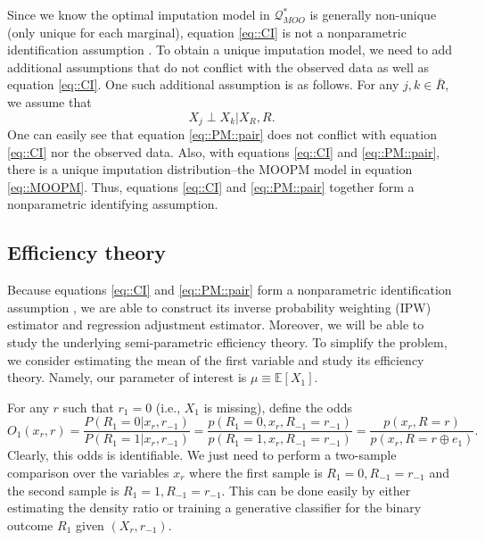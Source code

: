\documentclass[aos, preprint]{imsart}
\theoremstyle{plain}
\theoremstyle{definition}
\newcommand{\E}{\mbox{$\mathbb{E}$}}
\begin{document}


Since we know the optimal imputation model in $\mathcal{Q}^*_{MOO}$
is generally non-unique (only unique for each marginal), 
equation \eqref{eq::CI} is not a nonparametric identification assumption \citep{robins2000sensitivity}. 
To obtain a unique imputation model, 
we need to add additional assumptions that do not conflict with the observed data
as well as equation \eqref{eq::CI}.
One such additional assumption is as follows. 
For any $j,k \in \bar R$, we assume that
\begin{equation}
X_j\perp X_k|X_{R}, R.
\label{eq::PM::pair}
\end{equation}
One can easily see that equation \eqref{eq::PM::pair} does not conflict with equation \eqref{eq::CI}
nor the observed data. 
Also, with equations
\eqref{eq::CI} and \eqref{eq::PM::pair},
there is a unique imputation distribution--the MOOPM model in equation \eqref{eq::MOOPM}.
Thus, equations \eqref{eq::CI} and \eqref{eq::PM::pair} 
together form a nonparametric identifying assumption.



\subsection{Efficiency theory}


Because equations \eqref{eq::CI} and \eqref{eq::PM::pair}
form a nonparametric identification assumption \citep{robins2000sensitivity},
we are able to construct its inverse probability weighting (IPW) estimator
and regression adjustment estimator.
Moreover, we will be able to study
the underlying semi-parametric efficiency theory.
To simplify the problem, we consider estimating the mean of the first variable
and study its efficiency theory.
Namely, our parameter of interest is $\mu \equiv \E[X_1]$.


For any $r$ such that $r_1 = 0$ (i.e., $X_1$ is missing),
define the odds
$$
O_1(x_{r}, r) =  \frac{P(R_1=0|x_{r}, r_{-1})}{P(R_1=1|x_{r}, r_{-1})} = \frac{p(R_1=0,x_{r}, R_{-1}=r_{-1})}{p(R_1=1,x_{r}, R_{-1}=r_{-1})}
=  \frac{p(x_{r}, R = r)}{p( x_{r}, R=r\oplus e_1)}.
$$
Clearly, this odds is identifiable. 
We just need to perform a two-sample comparison over the variables $x_{r}$ where
the first sample is $R_1=0, R_{-1} = r_{-1}$ and the second sample is $R_1 = 1, R_{-1} = r_{-1}$.
This can be done easily by either estimating the density ratio \citep{sugiyama2012density}
or training a generative classifier for the binary outcome $R_1$ given $(X_r, r_{-1})$.
\end{document}
